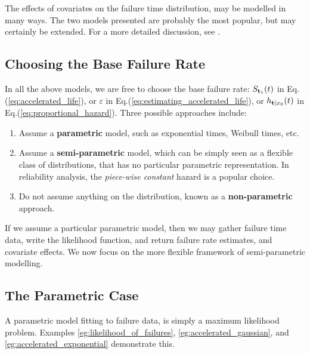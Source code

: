 




\begin{extra}
The effects of covariates on the failure time distribution, may be modelled in many ways. 
The two models presented are probably the most popular, but may certainly be extended. 
For a more detailed discussion, see \cite{cox_analysis_1984}.
\end{extra}





\subsection{Choosing the Base Failure Rate}
In all the above models, we are free to choose the base failure rate: 
$S_{\mathbf{t}_1} (t)$ in Eq.(\ref{eq:accelerated_life}), or
$\varepsilon$ in Eq.(\ref{eq:estimating_accelerated_life}), or 
$h_{\mathbf{t}|x_0} (t)$ in Eq.(\ref{eq:proportional_hazard}).
Three possible approaches include:
\begin{enumerate}
\item Assume a \textbf{parametric} model, such as exponential times, Weibull times, etc.
\item Assume a \textbf{semi-parametric} model, which can be simply seen as a flexible class of distributions, that has no particular parametric representation. In reliability analysis, the \emph{piece-wise constant} hazard is a popular choice.
\item Do not assume anything on the distribution, known as a \textbf{non-parametric} approach. 
\end{enumerate}
If we assume a particular parametric model, then we may gather failure time data, write the likelihood function, and return failure rate estimates, and covariate effects.
We now focus on the more flexible framework of semi-parametric modelling.


\subsection{The Parametric Case}
A parametric model fitting to failure data, is simply a maximum likelihood problem.
Examples \ref{eg:likelihood_of_failures}, \ref{eg:accelerated_gaussian}, and \ref{eg:accelerated_exponential} demonstrate this. 




